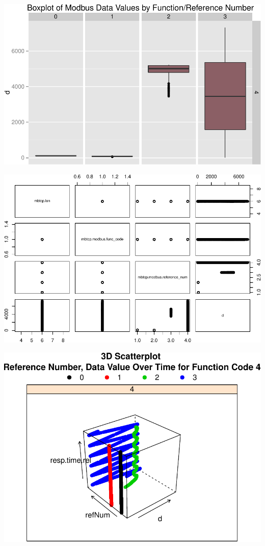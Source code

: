\documentclass[]{article}
\begin{document}
\pagebreak

\includegraphics{modbus_files/figure-latex/unnamed-chunk-20-1.pdf}

\includegraphics{modbus_files/figure-latex/unnamed-chunk-21-1.pdf}

\includegraphics{modbus_files/figure-latex/unnamed-chunk-22-1.pdf}
\end{document}
